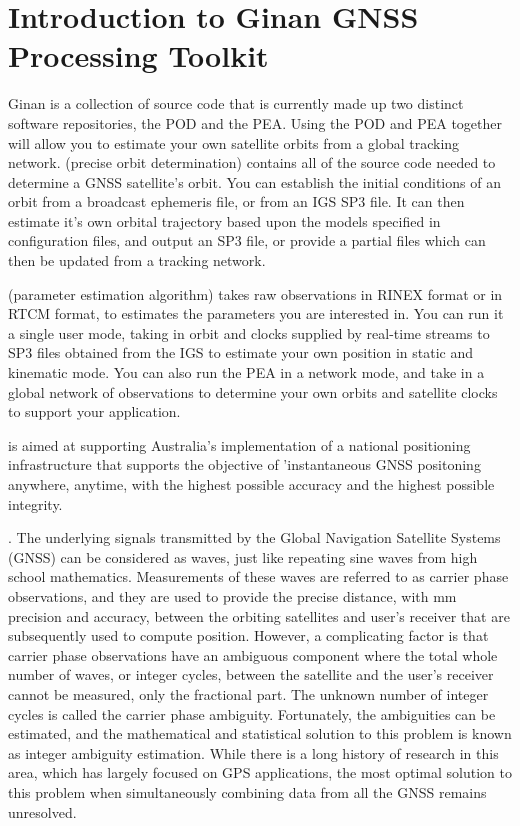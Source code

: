 \chapter{Introduction to Ginan GNSS Processing Toolkit}
\label{ch:introduction}
%


Ginan is a collection of source code that is currently made up two distinct software repositories, the POD  and the PEA.
Using the POD and PEA together will allow you to estimate your own satellite orbits from a global tracking network.
 (precise orbit determination) contains all of the source code needed to determine a GNSS satellite's orbit. You can establish the initial conditions of an orbit from a broadcast ephemeris file, or from an IGS SP3 file. It can then estimate it's own orbital trajectory based upon the models specified in configuration files, and output an SP3 file, or provide a partial files which can then be updated from a tracking network. 



 (parameter estimation algorithm) takes raw observations in RINEX format or in RTCM format, to estimates the parameters you are interested in. You can run it a single user mode, taking in orbit and clocks supplied by real-time streams to SP3 files obtained from the IGS to estimate your own position in static and kinematic mode. 
You can also run the PEA in a network mode, and take in a global network of observations to determine your own orbits and satellite clocks to support your application.

 is aimed at supporting Australia's implementation of a national positioning infrastructure that supports the objective of 'instantaneous GNSS positoning anywhere, anytime, with the highest possible accuracy and the highest possible integrity.

. The underlying signals transmitted by the Global Navigation Satellite Systems (GNSS) can be considered as waves, just like repeating sine waves from high school mathematics. Measurements of these waves are referred to as carrier phase observations, and they are used to provide the precise distance, with mm precision and accuracy, between the orbiting satellites and user’s receiver that are subsequently used to compute position. However, a complicating factor is that carrier phase observations have an ambiguous component where the total whole number of waves, or integer cycles, between the satellite and the user’s receiver cannot be measured, only the fractional part. The unknown number of integer cycles is called the carrier phase ambiguity. Fortunately, the ambiguities can be estimated, and the mathematical and statistical solution to this problem is known as integer ambiguity estimation. While there is a long history of research in this area, which has largely focused on GPS applications, the most optimal solution to this problem when simultaneously combining data from all the GNSS remains unresolved.

